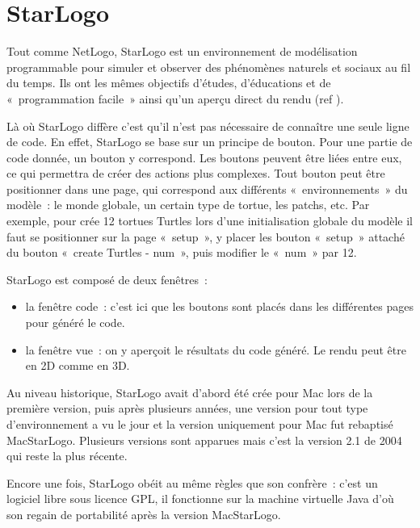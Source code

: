 \section{StarLogo}
\label{StarLogo}
Tout comme NetLogo, StarLogo est un environnement de modélisation programmable pour simuler et observer des phénomènes naturels et sociaux au fil du temps.
Ils ont les mêmes objectifs d'études, d'éducations et de «~programmation facile~» ainsi qu'un aperçu direct du rendu (ref \cite{starlogo}).

Là où StarLogo diffère c'est qu'il n'est pas nécessaire de connaître une seule ligne de code. En effet, StarLogo se base sur un principe de bouton. Pour une partie de code donnée, un bouton y correspond. Les boutons peuvent être liées entre eux, ce qui permettra de créer des actions plus complexes.
Tout bouton peut être positionner dans une page, qui correspond aux différents «~environnements~» du modèle~: le monde globale, un certain type de tortue, les patchs, etc.
Par exemple, pour crée 12 tortues Turtles lors d'une initialisation globale du modèle il faut se positionner sur la page «~setup~», y placer les bouton «~setup~» attaché du bouton «~create Turtles - num~», puis modifier le «~num~» par 12.

StarLogo est composé de deux fenêtres~:
\begin{itemize}
  \item la fenêtre code~: c'est ici que les boutons sont placés dans les différentes pages pour généré le code.
  \item la fenêtre vue~: on y aperçoit le résultats du code généré. Le rendu peut être en 2D comme en 3D.
\end{itemize}

Au niveau historique, StarLogo avait d'abord été crée pour Mac lors de la première version, puis après plusieurs années, une version pour tout type d'environnement a vu le jour et la version uniquement pour Mac fut rebaptisé MacStarLogo. Plusieurs versions sont apparues mais c'est la version 2.1 de 2004 qui reste la plus récente.

Encore une fois, StarLogo obéit au même règles que son confrère~: c'est un logiciel libre sous licence GPL, il fonctionne sur la machine virtuelle Java d'où son regain de portabilité après la version MacStarLogo.
